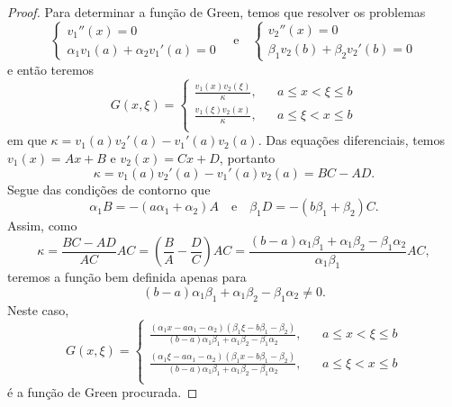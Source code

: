 \begin{proof}
    Para determinar a função de Green, temos que resolver os problemas
    \begin{equation*}
        \begin{cases}
            v_1''(x) = 0\\
            \alpha_1 v_1(a) + \alpha_2 v_1'(a) = 0
        \end{cases}
        \quad\text{e}\quad
        \begin{cases}
            v_2''(x) = 0\\
            \beta_1 v_2(b) + \beta_2 v_2'(b) = 0
        \end{cases}
    \end{equation*}
    e então teremos
    \begin{equation*}
        G(x, \xi) = \left\{\begin{aligned}
                \frac{v_1(x)v_2(\xi)}{\kappa},&& a \leq x < \xi \leq b\\
                \frac{v_1(\xi)v_2(x)}{\kappa},&& a \leq \xi < x \leq b\\
        \end{aligned}\right.
    \end{equation*}
    em que \(\kappa = v_1(a)v_2'(a) - v_1'(a)v_2(a).\) Das equações diferenciais, temos \(v_1(x) = Ax + B\) e \(v_2(x) = Cx + D\), portanto
    \begin{equation*}
        \kappa = v_1(a)v_2'(a) - v_1'(a)v_2(a) = BC - AD.
    \end{equation*}
    Segue das condições de contorno que
    \begin{equation*}
        \alpha_1B = -(a \alpha_1 + \alpha_2)A\quad\text{e}\quad \beta_1 D = -(b \beta_1 + \beta_2)C.
    \end{equation*}
    Assim, como 
    \begin{equation*}
        \kappa = \frac{BC - AD}{AC}AC = \left(\frac{B}{A} - \frac{D}{C}\right)AC = \frac{(b-a)\alpha_1 \beta_1 + \alpha_1 \beta_2 - \beta_1 \alpha_2}{\alpha_1 \beta_1}AC,
    \end{equation*}
    teremos a função bem definida apenas para
    \begin{equation*}
        (b - a)\alpha_1 \beta_1 + \alpha_1 \beta_2 - \beta_1 \alpha_2 \neq 0.
    \end{equation*}
    Neste caso,
    \begin{equation*}
        G(x,\xi) = \left\{\begin{aligned}
            \frac{(\alpha_1 x - a \alpha_1 - \alpha_2)(\beta_1 \xi - b \beta_1 - \beta_2)}{(b - a)\alpha_1 \beta_1 + \alpha_1 \beta_2 - \beta_1 \alpha_2}, && a \leq x < \xi \leq b\\
            \frac{(\alpha_1 \xi - a \alpha_1 - \alpha_2)(\beta_1 x - b \beta_1 - \beta_2)}{(b - a)\alpha_1 \beta_1 + \alpha_1 \beta_2 - \beta_1 \alpha_2}, && a \leq \xi < x \leq b\\
        \end{aligned}\right.
    \end{equation*}
    é a função de Green procurada.
\end{proof}
